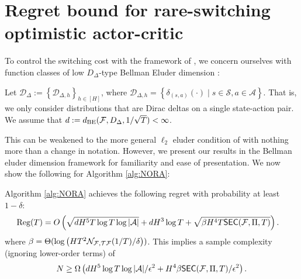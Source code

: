 

\section{Regret bound for rare-switching optimistic actor-critic}


To control the switching cost with the framework of \citet{xiong2023generalframeworksequentialdecisionmaking}, we concern ourselves with function classes of low $D_\Delta$-type Bellman Eluder dimension \citep{jin2021bellmaneluder}:

\begin{aspt}
    Let $\mathcal{D}_{\Delta}:=\left\{\mathcal{D}_{\Delta, h}\right\}_{h \in[H]}$, where $\mathcal{D}_{\Delta, h}=\left\{\delta_{(s, a)}(\cdot) \mid s \in \mathcal{S}, a \in \mathcal{A}\right\}$. That is, we only consider distributions that are Dirac deltas on a single state-action pair. We assume that $d := d_{\text{BE}}({\mathcal{F}}, D_\Delta, 1/\sqrt{T}) < \infty$. 
\end{aspt}

This can be weakened to the more general $\ell_2$ eluder condition of \cite{xiong2023generalframeworksequentialdecisionmaking} with nothing more than a change in notation. However, we present our results in the Bellman eluder dimension framework for familiarity and ease of presentation. We now show the following for Algorithm \ref{alg:NORA}:

\begin{thm}
\label{thm:nora-regret_bound}
Algorithm \ref{alg:NORA} achieves the following regret with probability at least $1-\delta$:
\begin{align}
    \mathrm{Reg}(T)
    &= O\left(\sqrt{d H^5 T \log T \log|{\mathcal{A}}|} + dH^3 \log T + \sqrt{\beta H^4 T  \mathsf{SEC}({\mathcal{F}}, \Pi, T)}\right).
\end{align}
where $\beta = \Theta(\log \left(HT^2 \mathcal{N}_{{\mathcal{F}},{\mathcal{T}} {\mathcal{F}}}(1/T) / \delta\right) )$.
This implies a sample complexity (ignoring lower-order terms) of 
\begin{align}N \geq \Omega\left(dH^5 \log T\log|{\mathcal{A}}|/\epsilon^2 + H^4 \beta \mathsf{SEC}({\mathcal{F}}, \Pi, T)/\epsilon^2\right).\end{align}
\end{thm}

